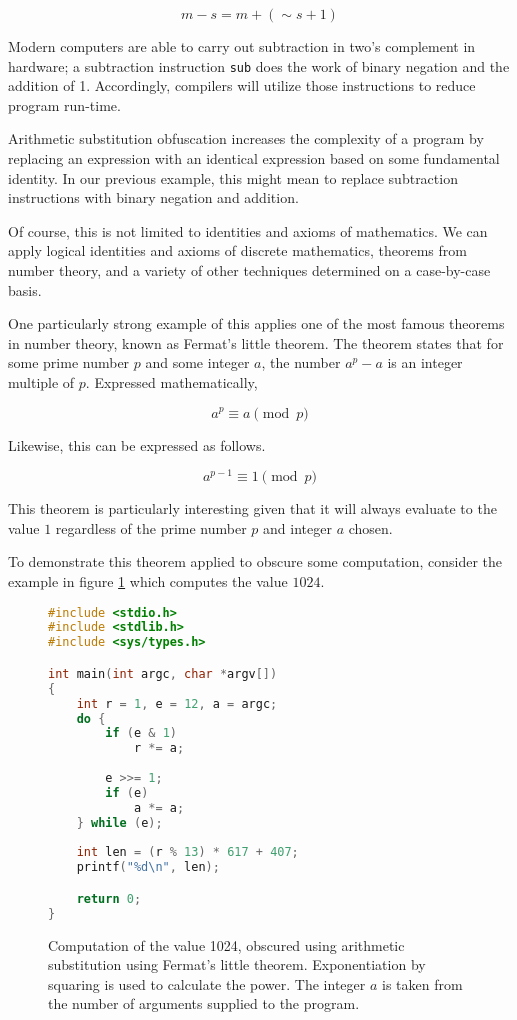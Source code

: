 \documentclass[conference]{IEEEtran}
\begin{document}
\begin{equation}
m - s = m + (\sim s + 1)
\end{equation}

Modern computers are able to carry out subtraction in two's complement in hardware; a subtraction instruction \texttt{sub} does the work of binary negation and the addition of 1. Accordingly, compilers will utilize those instructions to reduce program run-time.

Arithmetic substitution obfuscation increases the complexity of a program by replacing an expression with an identical expression based on some fundamental identity. In our previous example, this might mean to replace subtraction instructions with binary negation and addition.

Of course, this is not limited to identities and axioms of mathematics. We can apply logical identities and axioms of discrete mathematics, theorems from number theory, and a variety of other techniques determined on a case-by-case basis.

One particularly strong example of this applies one of the most famous theorems in number theory, known as Fermat's little theorem. The theorem states that for some prime number \(p\) and some integer \(a\), the number \(a^{p} - a\) is an integer multiple of \(p\). Expressed mathematically,

\begin{equation}
a^{p} \equiv a \pmod {p}
\end{equation}

Likewise, this can be expressed as follows.

\begin{equation}
a^{p - 1} \equiv 1 \pmod {p}
\end{equation}

This theorem is particularly interesting given that it will always evaluate to the value \(1\) regardless of the prime number \(p\) and integer \(a\) chosen.

To demonstrate this theorem applied to obscure some computation, consider the example in figure \ref{fig:arithmetic-sub-code-example} which computes the value \(1024\).

\begin{figure}[h]
\begin{lstlisting}[language=C,basicstyle=\footnotesize]
#include <stdio.h>
#include <stdlib.h>
#include <sys/types.h>

int main(int argc, char *argv[])
{
	int r = 1, e = 12, a = argc;
	do {
		if (e & 1)
			r *= a;
		
		e >>= 1;
		if (e)
			a *= a;
	} while (e);
	
	int len = (r % 13) * 617 + 407;
	printf("%d\n", len);

	return 0;
}
\end{lstlisting}
\caption{Computation of the value 1024, obscured using arithmetic substitution using Fermat's little theorem. Exponentiation by squaring is used to calculate the power. The integer \(a\) is taken from the number of arguments supplied to the program.}
\label{fig:arithmetic-sub-code-example}
\end{figure}
\end{document}
